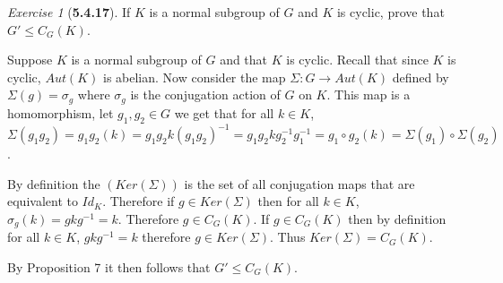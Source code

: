 \documentclass[12pt]{amsart}
\makeatletter
\theoremstyle{remark}
\newtheorem*{exercise}{Exercise}%
\renewenvironment{proof}[1][\proofname]{\par\doublespacing
  \pushQED{\qed}%
  \normalfont \topsep6\p@\@plus6\p@\relax
  \list{}{%
    \settowidth{\leftmargin}{\itshape\proofname:\hskip\labelsep}%
    \setlength{\labelwidth}{0pt}%
    \setlength{\itemindent}{-\leftmargin}%
  }%
  \item[\hskip\labelsep\itshape#1\@addpunct{:}]\ignorespaces
}{%
  \popQED\endlist\@endpefalse
  \singlespacing
}
\theoremstyle{mycomment}
\makeatother
\begin{document}
\begin{exercise}[\textbf{5.4.17}] If $K$ is a normal subgroup of $G$ and $K$ is 
  cyclic, prove that $G' \leq C_G(K)$.
  \begin{proof} Suppose $K$ is a normal subgroup of $G$ and that $K$ is cyclic. Recall that since $K$ is cyclic, $Aut(K)$ is abelian. Now consider the map $\Sigma: G \to Aut(K)$ defined by 
    $\Sigma(g) = \sigma_g$ where $\sigma_g$ is the conjugation action of $G$ on $K$.
    This map is a homomorphism, let $g_1, g_2 \in G$ we get that for all $k \in K$, $\Sigma(g_1g_2) = g_1g_2(k) = g_1g_2 k (g_1g_2)^{-1} = g_1g_2 k g_2^{-1}g_1^{-1} = g_1 \circ g_2(k) = \Sigma(g_1) \circ \Sigma(g_2)$. 

    By definition the $(Ker(\Sigma))$ is the set of all conjugation maps that are equivalent to $Id_K$. Therefore if $g \in Ker(\Sigma)$ then for all $k \in K$, $\sigma_g(k) = gkg^{-1} = k$. Therefore $g \in C_G(K)$. If $g \in C_G(K)$ then by definition for all $k \in K$, $gkg^{-1} = k$
    therefore $g \in Ker(\Sigma)$. Thus $Ker(\Sigma) = C_G(K)$. 

    By Proposition 7 it then follows that $G' \leq C_G(K)$.
  \end{proof}
\end{exercise}
\vspace{.15in}
\end{document}
